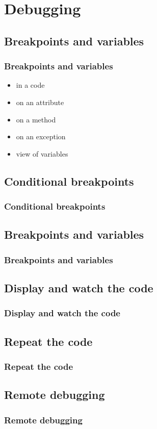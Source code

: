 \documentclass{beamer}
\begin{document}
\section{Debugging}

\subsection{Breakpoints and variables}
\begin{frame}[fragile]
\frametitle{Breakpoints and variables}
\begin{itemize}
\item in a code
\item on an attribute
\item on a method
\item on an exception
\item view of variables
\end{itemize}
\end{frame}


\subsection{Conditional breakpoints}
\begin{frame}[fragile]
\frametitle{Conditional breakpoints}
\end{frame}

\subsection{Breakpoints and variables}
\begin{frame}[fragile]
\frametitle{Breakpoints and variables}
\end{frame}

\subsection{Display and watch the code}
\begin{frame}[fragile]
\frametitle{Display and watch the code}
\end{frame}

\subsection{Repeat the code}
\begin{frame}[fragile]
\frametitle{Repeat the code}
\end{frame}

\subsection{Remote debugging}
\begin{frame}[fragile]
\frametitle{Remote debugging}
\end{frame}
\end{document}
